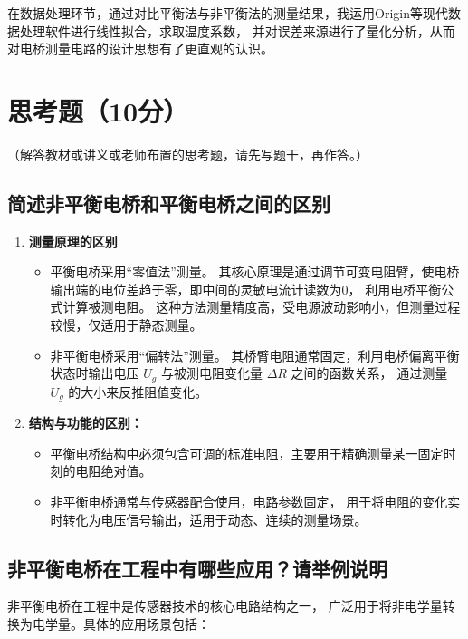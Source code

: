 \documentclass{../../templates/Report}%
\begin{document}
\begin{fullreportonly}
    在数据处理环节，通过对比平衡法与非平衡法的测量结果，我运用Origin等现代数据处理软件进行线性拟合，求取温度系数，
    并对误差来源进行了量化分析，从而对电桥测量电路的设计思想有了更直观的认识。

    \section{思考题（10分）}
    （解答教材或讲义或老师布置的思考题，请先写题干，再作答。）
    \subsection{简述非平衡电桥和平衡电桥之间的区别}
    \begin{enumerate}
        \item \textbf{测量原理的区别}
              \begin{itemize}
                  \item 平衡电桥采用“零值法”测量。
                        其核心原理是通过调节可变电阻臂，使电桥输出端的电位差趋于零，即中间的灵敏电流计读数为0，
                        利用电桥平衡公式计算被测电阻。
                        这种方法测量精度高，受电源波动影响小，但测量过程较慢，仅适用于静态测量。
                  \item 非平衡电桥采用“偏转法”测量。
                        其桥臂电阻通常固定，利用电桥偏离平衡状态时输出电压 $U_g$ 与被测电阻变化量 $\Delta R$ 之间的函数关系，
                        通过测量 $U_g$ 的大小来反推阻值变化。
              \end{itemize}
        \item \textbf{结构与功能的区别：}
              \begin{itemize}
                  \item 平衡电桥结构中必须包含可调的标准电阻，主要用于精确测量某一固定时刻的电阻绝对值。
                  \item 非平衡电桥通常与传感器配合使用，电路参数固定，
                        用于将电阻的变化实时转化为电压信号输出，适用于动态、连续的测量场景。
              \end{itemize}
    \end{enumerate}

    \subsection{非平衡电桥在工程中有哪些应用？请举例说明}
    非平衡电桥在工程中是传感器技术的核心电路结构之一，
    广泛用于将非电学量转换为电学量。具体的应用场景包括：


\end{fullreportonly}
\end{document}
